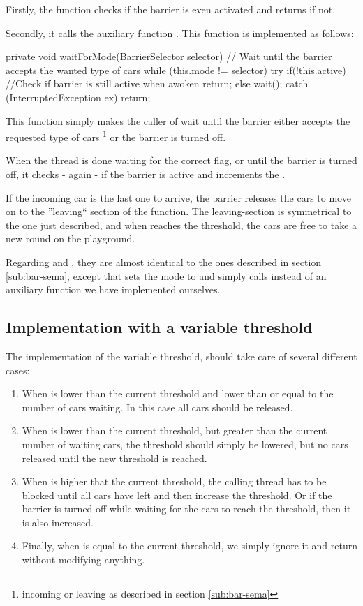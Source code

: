 Firstly, the function checks if the barrier is even activated and returns if not.

Secondly, it calls the auxiliary function . This function is implemented as follows:

\begin{java}
private void waitForMode(BarrierSelector selector) {
	// Wait until the barrier accepts the wanted type of cars
	while (this.mode != selector) {
		try {
			if(!this.active) //Check if barrier is still active when awoken
				return;
			else
				wait();
		}
		catch (InterruptedException ex) { return; }
	}
}
\end{java}

This function simply makes the caller of  wait until the barrier either accepts the requested type of cars 
\footnote{incoming or leaving as described in section \ref{sub:bar-sema}}
or the barrier is turned off.

When the thread is done waiting for the correct flag, or until the barrier is turned off, it checks - again - if the barrier is active and increments the .

If the incoming car is the last one to arrive, the barrier releases the cars to move on to the ''leaving`` section of the function. The leaving-section is symmetrical to the one just described, and when  reaches the threshold, the cars are free to take a new round on the playground.

Regarding  and , they are almost identical to the ones described in section \ref{sub:bar-sema}, except that  sets the mode to  and simply calls  instead of an auxiliary function we have implemented ourselves.


\subsection{Implementation with a variable threshold}
\label{sub:bar-thres}
The implementation of the variable threshold, should take care of several different cases:

\begin{enumerate}
	\item When  is lower than the current threshold and lower than or equal to the number of cars waiting. In this case all cars should be released.
	\item When  is lower than the current threshold, but greater than the current number of waiting cars, the threshold should simply be lowered, but no cars released until the new threshold is reached.
	\item When  is higher that the current threshold, the calling thread has to be blocked until all cars have left and then increase the threshold. Or if the barrier is turned off while waiting for the cars to reach the threshold, then it is also increased.
	\item Finally, when  is equal to the current threshold, we simply ignore it and return without modifying anything.
\end{enumerate}

